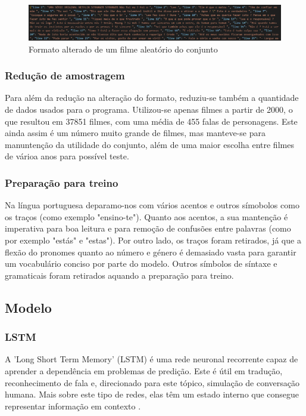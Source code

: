 \documentclass{article}
\begin{document}
\begin{figure}
	\centering
    \includegraphics[scale=0.28]{json.png}
    \caption{Formato alterado de um filme aleatório do conjunto}
    \label{jsonimg}
\end{figure}

\subsubsection{Redução de amostragem}
Para além da redução na alteração do formato, reduziu-se também a quantidade de dados usados para o programa. Utilizou-se apenas filmes a partir de 2000, o que resultou em 37851 filmes, com uma média de 455 falas de personagens. Este ainda assim é um número muito grande de filmes, mas manteve-se para manuntenção da utilidade do conjunto, além de uma maior escolha entre filmes de várioa anos para possível teste.

\subsubsection{Preparação para treino}
Na língua portuguesa deparamo-nos com vários acentos e outros símobolos como os traços (como exemplo "ensino-te"). Quanto aos acentos, a sua mantenção é imperativa para boa leitura e para remoção de confusões entre palavras (como por exemplo "estás" e "estas"). Por outro lado, os traços foram retirados, já que a flexão do pronomes quanto ao número e género é demasiado vasta para garantir um vocabulário conciso por parte do modelo. Outros símbolos de síntaxe e gramaticais foram retirados aquando a preparação para treino.


\subsection{Modelo}


\subsubsection{LSTM}
A 'Long Short Term Memory' (LSTM) é uma rede neuronal recorrente capaz de aprender a dependência em problemas de predição. Este é útil em tradução, reconhecimento de fala e, direcionado para este tópico, simulação de conversação humana. Mais sobre este tipo de redes, elas têm um estado interno que consegue representar informação em contexto \cite{bengio1994learning}.
\end{document}
